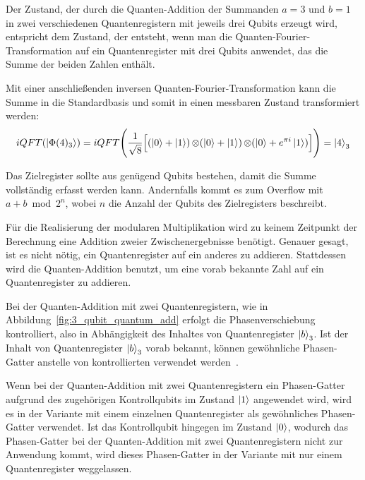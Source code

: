 Der Zustand, 
der durch die Quanten-Addition der Summanden \(a=3\) und 
\(b=1\) in zwei verschiedenen Quantenregistern mit jeweils drei Qubits erzeugt wird, 
entspricht dem Zustand, der entsteht, 
wenn man die Quanten-Fourier-Transformation auf ein Quantenregister mit drei Qubits anwendet, 
das die Summe der beiden Zahlen enthält.

Mit einer anschließenden inversen Quanten-Fourier-Transformation 
kann die Summe in die Standardbasis und somit in einen messbaren Zustand transformiert werden:
\[
iQFT(\ket{\Phi(4)_3})
=
 iQFT \Bigg(\frac{1}{\sqrt{8}} \Big[ (\ket{0} + \ket{1} ) \operatorname{\otimes}
( \ket{0} +   \ket{1} ) \operatorname{\otimes}
( \ket{0} +  e^{\pi i }\ket{1} ) \Big]\Bigg) 
=
\ket{4}_3
\]

Das Zielregister sollte aus genügend Qubits bestehen, 
damit die Summe vollständig erfasst werden kann.
Andernfalls kommt es zum Overflow mit \(a + b \bmod 2^n\), 
wobei \(n\) die Anzahl der Qubits des Zielregisters beschreibt.

Für die Realisierung der modularen Multiplikation wird zu keinem Zeitpunkt der Berechnung eine Addition zweier Zwischenergebnisse benötigt. 
Genauer gesagt, ist es nicht nötig, ein Quantenregister auf ein anderes zu addieren. 
Stattdessen wird die Quanten-Addition benutzt, um eine vorab bekannte Zahl auf ein Quantenregister zu addieren.

Bei der Quanten-Addition mit zwei Quantenregistern, 
wie in Abbildung~\ref{fig:3_qubit_quantum_add} erfolgt die Phasenverschiebung kontrolliert,  
also in Abhängigkeit des Inhaltes von Quantenregister \(\ket{b}_3\).
Ist der Inhalt von Quantenregister \(\ket{b}_3\) vorab bekannt,
können gewöhnliche Phasen-Gatter anstelle von kontrollierten verwendet werden~\cite{beauregard2003circuit}.

Wenn bei der Quanten-Addition mit zwei Quantenregistern ein Phasen-Gatter aufgrund des zugehörigen Kontrollqubits im Zustand \(\ket{1}\) angewendet wird,
wird es in der Variante mit einem einzelnen Quantenregister als gewöhnliches Phasen-Gatter verwendet.
Ist das Kontrollqubit hingegen im Zustand \(\ket{0}\), 
wodurch das Phasen-Gatter bei der Quanten-Addition mit zwei Quantenregistern nicht zur Anwendung kommt, 
wird dieses Phasen-Gatter in der Variante mit nur einem Quantenregister weggelassen.


